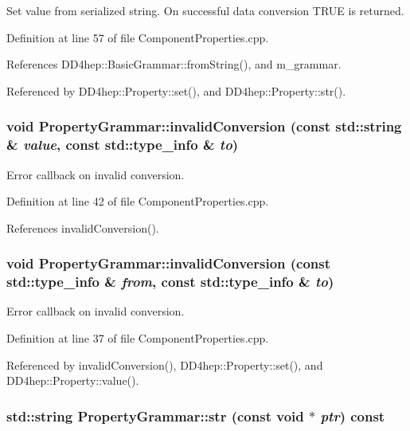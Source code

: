 Set value from serialized string. On successful data conversion TRUE is returned. 

Definition at line 57 of file ComponentProperties.cpp.

References DD4hep::BasicGrammar::fromString(), and m\_\-grammar.

Referenced by DD4hep::Property::set(), and DD4hep::Property::str().\hypertarget{class_d_d4hep_1_1_property_grammar_af0a4553e93979108dd872da16091e206}{
\subsubsection[{invalidConversion}]{\setlength{\rightskip}{0pt plus 5cm}void PropertyGrammar::invalidConversion (const std::string \& {\em value}, \/  const std::type\_\-info \& {\em to})}}
\label{class_d_d4hep_1_1_property_grammar_af0a4553e93979108dd872da16091e206}


Error callback on invalid conversion. 

Definition at line 42 of file ComponentProperties.cpp.

References invalidConversion().\hypertarget{class_d_d4hep_1_1_property_grammar_ac36bdd6df04d3f26daff768377e1583a}{
\subsubsection[{invalidConversion}]{\setlength{\rightskip}{0pt plus 5cm}void PropertyGrammar::invalidConversion (const std::type\_\-info \& {\em from}, \/  const std::type\_\-info \& {\em to})}}
\label{class_d_d4hep_1_1_property_grammar_ac36bdd6df04d3f26daff768377e1583a}


Error callback on invalid conversion. 

Definition at line 37 of file ComponentProperties.cpp.

Referenced by invalidConversion(), DD4hep::Property::set(), and DD4hep::Property::value().\hypertarget{class_d_d4hep_1_1_property_grammar_a876ca7bd3ed0fa75bb4abce8a877d569}{
\subsubsection[{str}]{\setlength{\rightskip}{0pt plus 5cm}std::string PropertyGrammar::str (const void $\ast$ {\em ptr}) const}}
\label{class_d_d4hep_1_1_property_grammar_a876ca7bd3ed0fa75bb4abce8a877d569}


